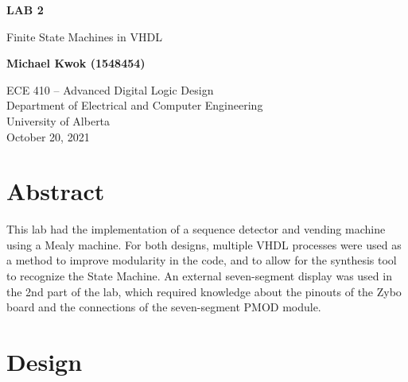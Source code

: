 \documentclass[12pt]{article}
\begin{document}
\begin{titlepage}
  \begin{center}
    \vspace*{1cm}

    \textbf{LAB 2}

    \vspace{0.5cm}

    Finite State Machines in VHDL

    \vspace{1.5cm}

    \textbf{Michael Kwok (1548454)}

    \vfill

    ECE 410 -- Advanced Digital Logic Design\\
    Department of Electrical and Computer Engineering\\
    University of Alberta\\
    October 20, 2021

  \end{center}
\end{titlepage}

\tableofcontents

\pagebreak

\section{Abstract}

This lab had the implementation of a sequence detector and vending machine using a Mealy machine.
For both designs, multiple VHDL processes were used as a method to improve modularity in the code, and to allow for the
synthesis tool to recognize the State Machine. An external seven-segment display was used in the 2nd part of the lab,
which required knowledge about the pinouts of the Zybo board and the connections of the seven-segment PMOD module.

\section{Design}
\end{document}
